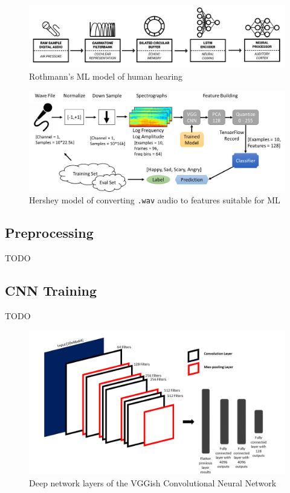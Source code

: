 \documentclass{article}
\begin{document}
\begin{figure}[]
	\centering
	\includegraphics[width=1.0\textwidth]{Rothmann_Flow.png}  
	\caption{Rothmann's	\cite{rothmann} ML model of human hearing}
	\label{fig:rothman_flow}
\end{figure}

\begin{figure}[]
	\centering
	\includegraphics[width=1.0\textwidth]{VGG Flow.png}  
	\caption{Hershey \cite{hershey} model of converting \texttt{.wav} audio to features suitable for ML}
	\label{fig:vgg_flow}
\end{figure}

\subsection{Preprocessing}\label{sec:preprocessing}

TODO

\subsection{CNN Training}\label{sec:cnntraining}

TODO


\begin{figure}[]
	\centering
	\includegraphics[width=1.0\textwidth]{vggish_cnn_3.png}  
	\caption{Deep network layers of the VGGish Convolutional Neural Network}
	\label{fig:vggish_cnn}
\end{figure}
	
\end{document}
